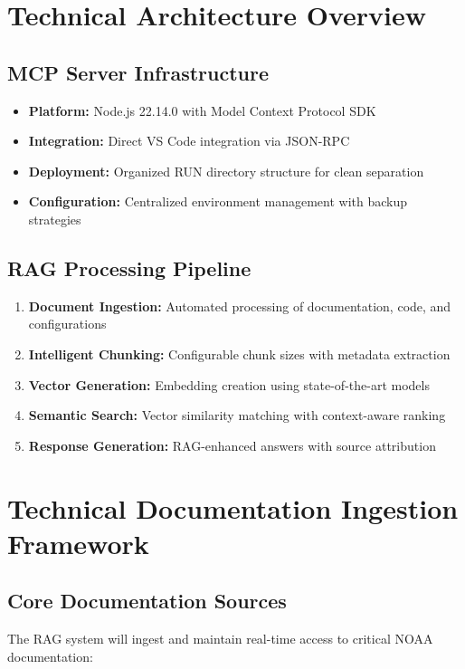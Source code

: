 \documentclass[11pt,letterpaper]{article}
\begin{document}
\section{Technical Architecture Overview}

\subsection{MCP Server Infrastructure}
\begin{itemize}
    \item \textbf{Platform:} Node.js 22.14.0 with Model Context Protocol SDK
    \item \textbf{Integration:} Direct VS Code integration via JSON-RPC
    \item \textbf{Deployment:} Organized RUN directory structure for clean separation
    \item \textbf{Configuration:} Centralized environment management with backup strategies
\end{itemize}

\subsection{RAG Processing Pipeline}

\begin{center}
\end{center}

\begin{enumerate}
    \item \textbf{Document Ingestion:} Automated processing of documentation, code, and configurations
    \item \textbf{Intelligent Chunking:} Configurable chunk sizes with metadata extraction
    \item \textbf{Vector Generation:} Embedding creation using state-of-the-art models
    \item \textbf{Semantic Search:} Vector similarity matching with context-aware ranking
    \item \textbf{Response Generation:} RAG-enhanced answers with source attribution
\end{enumerate}

\section{Technical Documentation Ingestion Framework}

\subsection{Core Documentation Sources}
The RAG system will ingest and maintain real-time access to critical NOAA documentation:
\end{document}
